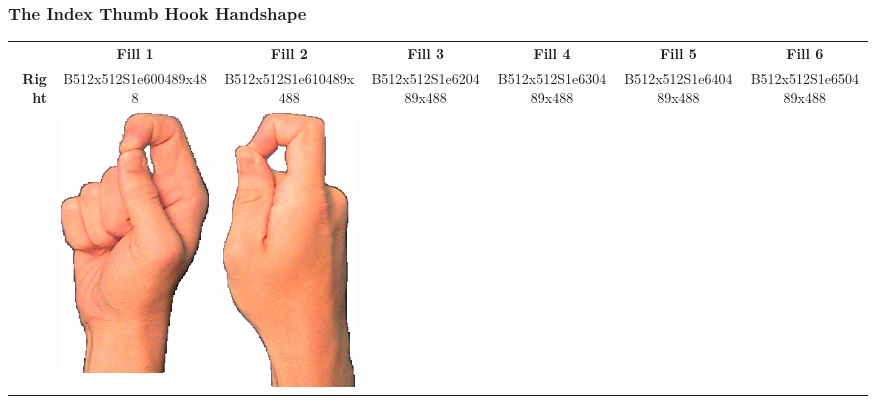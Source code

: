 \documentclass{article}
\begin{document}
\subsubsection{The Index Thumb Hook Handshape}

\begin{center}
\begin{tabular}{r*{6}{c}}
&\textbf{Fill 1}&\textbf{Fill 2}&\textbf{Fill 3}&\textbf{Fill 4}&\textbf{Fill 5}&\textbf{Fill 6}\\
\multirow{2}{*}{\textbf{Right}}&
B512x512S1e600489x488&
B512x512S1e610489x488&
B512x512S1e620489x488&
B512x512S1e630489x488&
B512x512S1e640489x488&
B512x512S1e650489x488\\
&
\includegraphics[scale=0.1]{images/09-06-1.jpg}&
\includegraphics[scale=0.1]{images/09-06-2.jpg}&

\end{tabular}
\end{center}
\end{document}
